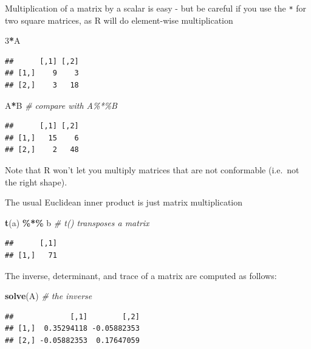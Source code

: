 \documentclass[
]{book}
\newenvironment{Shaded}{\begin{snugshade}}{\end{snugshade}}
\newcommand{\CommentTok}[1]{\textcolor[rgb]{0.56,0.35,0.01}{\textit{#1}}}
\newcommand{\DecValTok}[1]{\textcolor[rgb]{0.00,0.00,0.81}{#1}}
\newcommand{\FunctionTok}[1]{\textcolor[rgb]{0.13,0.29,0.53}{\textbf{#1}}}
\newcommand{\NormalTok}[1]{#1}
\newcommand{\SpecialCharTok}[1]{\textcolor[rgb]{0.81,0.36,0.00}{\textbf{#1}}}
\theoremstyle{definition}
\theoremstyle{definition}
\theoremstyle{definition}
\theoremstyle{definition}
\theoremstyle{remark}
\begin{document}
Multiplication of a matrix by a scalar is easy - but be careful if you use the \texttt{*} for two square matrices, as R will do element-wise multiplication

\begin{Shaded}
\begin{Highlighting}[]
\DecValTok{3}\SpecialCharTok{*}\NormalTok{A}
\end{Highlighting}
\end{Shaded}

\begin{verbatim}
##      [,1] [,2]
## [1,]    9    3
## [2,]    3   18
\end{verbatim}

\begin{Shaded}
\begin{Highlighting}[]
\NormalTok{A}\SpecialCharTok{*}\NormalTok{B }\CommentTok{\# compare with A\%*\%B}
\end{Highlighting}
\end{Shaded}

\begin{verbatim}
##      [,1] [,2]
## [1,]   15    6
## [2,]    2   48
\end{verbatim}

Note that R won't let you multiply matrices that are not conformable (i.e.~not the right shape).

The usual Euclidean inner product is just matrix multiplication

\begin{Shaded}
\begin{Highlighting}[]
\FunctionTok{t}\NormalTok{(a) }\SpecialCharTok{\%*\%}\NormalTok{ b  }\CommentTok{\# t() transposes a matrix}
\end{Highlighting}
\end{Shaded}

\begin{verbatim}
##      [,1]
## [1,]   71
\end{verbatim}

The inverse, determinant, and trace of a matrix are computed as follows:

\begin{Shaded}
\begin{Highlighting}[]
\FunctionTok{solve}\NormalTok{(A) }\CommentTok{\# the inverse}
\end{Highlighting}
\end{Shaded}

\begin{verbatim}
##             [,1]        [,2]
## [1,]  0.35294118 -0.05882353
## [2,] -0.05882353  0.17647059
\end{verbatim}
\end{document}
